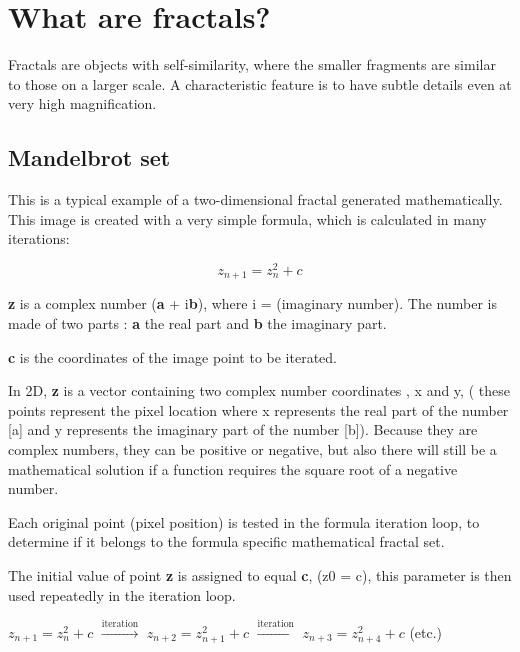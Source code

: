 \section{What are fractals?}\label{what-are-fractals}

Fractals are objects with self-similarity, where the smaller fragments
are similar to those on a larger scale. A characteristic feature is to
have subtle details even at very high magnification.

\subsection{Mandelbrot set}\label{mandelbrot-set}

This is a typical example of a two-dimensional fractal generated
mathematically. This image is created with a very simple formula, which
is calculated in many iterations:

\[z_{n + 1} = z_{n}^{2} + c\]

\textbf{z} is a complex number (\textbf{a} + i\textbf{b}), where i = (imaginary
number). The number is made of two parts : \textbf{a} the real part
and \textbf{b} the imaginary part.

\textbf{c} is the coordinates of the image point to be iterated.

In 2D, \textbf{z} is a vector containing two complex number coordinates , x
and y, ( these points represent the pixel location where x represents
the real part of the number {[}a{]} and y represents the imaginary part
of the number {[}b{]}). Because they are complex numbers, they can be
positive or negative, but also there will still be a mathematical
solution if a function requires the square root of a negative number.

Each original point (pixel position) is tested in the formula iteration
loop, to determine if it belongs to the formula specific mathematical
fractal set.

The initial value of point \textbf{z} is assigned to equal \textbf{c}, (z0 = c),
this parameter is then used repeatedly in the iteration loop.

\(z_{n + 1} = z_{n}^{2} + c\)
\hspace{10px}
$\xrightarrow[\text{}]{\text{iteration}}$
\hspace{10px}
\(z_{n + 2} = z_{n + 1}^{2} + c\)
\hspace{10px}
$\xrightarrow[\text{}]{\text{iteration}}$
\hspace{10px}
\(z_{n + 3} = z_{n + 4}^{2} + c\)
\hspace{10px}
(etc.)


